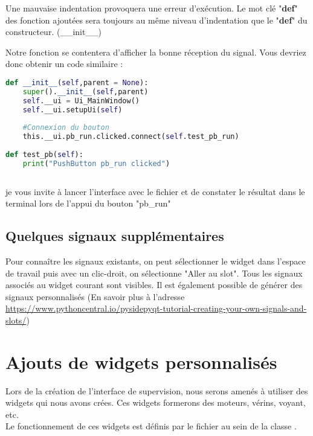 {Une mauvaise indentation provoquera une erreur d'exécution. 
Le mot clé "\textbf{def}" des fonction ajoutées sera toujours au même niveau d'indentation que le "\textbf{def}" du constructeur. (\_\_init\_\_)\newline

Notre fonction  se contentera d'afficher la bonne réception du signal. Vous devriez donc obtenir un code similaire : \newline

\begin{lstlisting}[language=Python]
def __init__(self,parent = None):
    super().__init__(self,parent)
    self.__ui = Ui_MainWindow()
    self.__ui.setupUi(self)
    
    #Connexion du bouton
    this.__ui.pb_run.clicked.connect(self.test_pb_run)
        
def test_pb(self):
    print("PushButton pb_run clicked")
        
\end{lstlisting}

je vous invite à lancer l'interface avec le fichier  et de constater le résultat dans le terminal lors de l'appui du bouton "pb\_run"
\section{Quelques signaux supplémentaires}

Pour connaître les signaux existants, on peut sélectionner le widget dans l'espace de travail puis avec un clic-droit, on sélectionne "Aller au slot". \newline
Tous les signaux associés au widget courant sont visibles.
Il est également possible de générer des signaux personnalisés (En savoir plus à l'adresse \url{https://www.pythoncentral.io/pysidepyqt-tutorial-creating-your-own-signals-and-slots/})



\chapter{Ajouts de widgets personnalisés}

Lors de la création de l'interface de supervision, nous serons amenés à utiliser des widgets qui nous avons crées. \newline
Ces widgets formerons des moteurs, vérins, voyant, etc. \\
Le fonctionnement de ces widgets est définis par le fichier  au sein de la classe .

}
